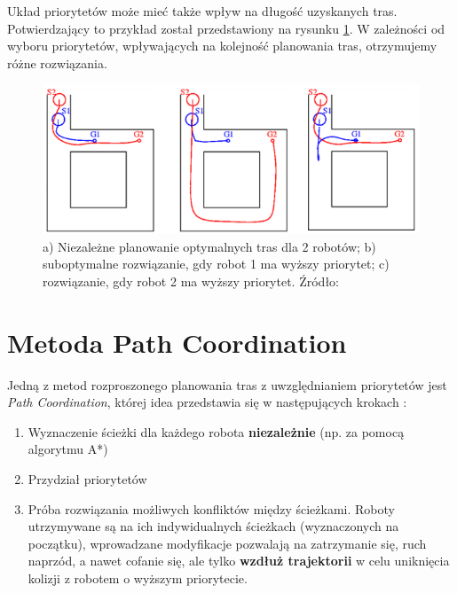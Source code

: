 Układ priorytetów może mieć także wpływ na długość uzyskanych tras. Potwierdzający to przykład został przedstawiony na rysunku \ref{fig:image_article1_ppt6}. W zależności od wyboru priorytetów, wpływających na kolejność planowania tras, otrzymujemy różne rozwiązania.
\begin{figure}
	\centering
	\includegraphics[width=13cm]{img/article1/ppt6}
	\caption{a) Niezależne planowanie optymalnych tras dla 2 robotów; b) suboptymalne rozwiązanie, gdy robot 1 ma wyższy priorytet; c) rozwiązanie, gdy robot 2 ma wyższy priorytet. Źródło: \cite{optpriorities}}
	\label{fig:image_article1_ppt6}
\end{figure}

\section{Metoda Path Coordination}
Jedną z metod rozproszonego planowania tras z uwzględnianiem priorytetów jest {\it Path Coordination}, której idea przedstawia się w następujących krokach \cite{optpriorities}:
\begin{enumerate}
	\item Wyznaczenie ścieżki dla każdego robota {\bf niezależnie} (np. za pomocą algorytmu A*)
	\item Przydział priorytetów
	\item Próba rozwiązania możliwych konfliktów między ścieżkami. Roboty utrzymywane są na ich indywidualnych ścieżkach (wyznaczonych na początku), wprowadzane modyfikacje pozwalają na zatrzymanie się, ruch naprzód, a nawet cofanie się, ale tylko {\bf wzdłuż trajektorii} w celu uniknięcia kolizji z robotem o wyższym priorytecie.
\end{enumerate}